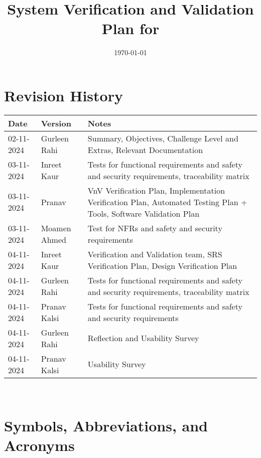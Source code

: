 \documentclass[12pt, titlepage]{article}
\begin{document}
\title{System Verification and Validation Plan for \progname{}} 
\author{\authname}
\date{\today}
	
\maketitle


\section*{Revision History}

\begin{tabularx}{\textwidth}{p{3cm}p{2cm}X}
\toprule {\bf Date} & {\bf Version} & {\bf Notes}\\
\midrule
02-11-2024 & Gurleen Rahi & Summary, Objectives, Challenge Level and Extras, Relevant Documentation\\
03-11-2024 & Inreet Kaur & Tests for functional requirements and safety and security requirements, traceability matrix\\
03-11-2024 & Pranav & VnV Verification Plan, Implementation Verification Plan, Automated Testing Plan + Tools, Software Validation Plan\\
03-11-2024 & Moamen Ahmed & Test for NFRs and safety and security requirements\\
04-11-2024 & Inreet Kaur & Verification and Validation team, SRS Verification Plan, Design Verification Plan\\
04-11-2024 & Gurleen Rahi & Tests for functional requirements and safety and security requirements, traceability matrix\\
04-11-2024 & Pranav Kalsi & Tests for functional requirements and safety and security requirements\\
04-11-2024 & Gurleen Rahi & Reflection and Usability Survey\\
04-11-2024 & Pranav Kalsi & Usability Survey\\
\bottomrule
\end{tabularx}

~\\

\newpage

\tableofcontents

\listoftables


\newpage

\section{Symbols, Abbreviations, and Acronyms} \label{section:1}
\end{document}
